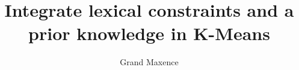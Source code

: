 \documentclass{article}       %
\begin{document}
\title{Integrate lexical constraints and a prior knowledge in K-Means}
\author{Grand Maxence}







\nocite{*}
\printbibliography[title=References]
\end{document}
